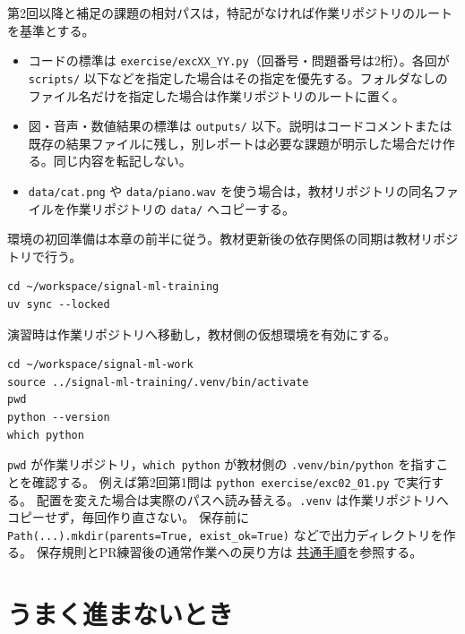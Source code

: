 第2回以降と補足の課題の相対パスは，特記がなければ作業リポジトリのルートを基準とする。

\begin{itemize}
\item
  コードの標準は
  \texttt{exercise/excXX\_YY.py}（回番号・問題番号は2桁）。各回が
  \texttt{scripts/}
  以下などを指定した場合はその指定を優先する。フォルダなしのファイル名だけを指定した場合は作業リポジトリのルートに置く。
\item
  図・音声・数値結果の標準は \texttt{outputs/}
  以下。説明はコードコメントまたは既存の結果ファイルに残し，別レポートは必要な課題が明示した場合だけ作る。同じ内容を転記しない。
\item
  \texttt{data/cat.png} や \texttt{data/piano.wav}
  を使う場合は，教材リポジトリの同名ファイルを作業リポジトリの \texttt{data/}
  へコピーする。
\end{itemize}

環境の初回準備は本章の前半に従う。教材更新後の依存関係の同期は教材リポジトリで行う。

\begin{lstlisting}[style=codecell]
cd ~/workspace/signal-ml-training
uv sync --locked
\end{lstlisting}

演習時は作業リポジトリへ移動し，教材側の仮想環境を有効にする。

\begin{lstlisting}[style=codecell]
cd ~/workspace/signal-ml-work
source ../signal-ml-training/.venv/bin/activate
pwd
python --version
which python
\end{lstlisting}

\texttt{pwd} が作業リポジトリ，\texttt{which\ python} が教材側の
\texttt{.venv/bin/python} を指すことを確認する。 例えば第2回第1問は
\texttt{python\ exercise/exc02\_01.py} で実行する。
配置を変えた場合は実際のパスへ読み替える。\texttt{.venv}
は作業リポジトリへコピーせず，毎回作り直さない。 保存前に
\texttt{Path(...).mkdir(parents=True,\ exist\_ok=True)}
などで出力ディレクトリを作る。 保存規則とPR練習後の通常作業への戻り方は
\href{https://github.com/ykinolab-tokai/signal-ml-training/blob/main/handouts/README.md\#作業場所と保存先}{共通手順}を参照する。

\section{うまく進まないとき}

